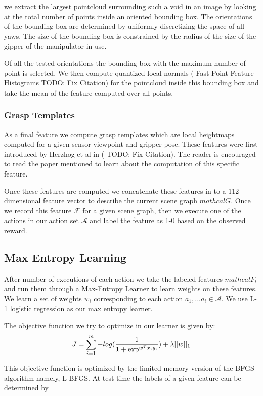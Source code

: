 we extract the largest pointcloud surrounding such a void in an image by looking at the total number of points inside an oriented bounding box. The orientations of the bounding box are determined by uniformly discretizing the space of all yaws. The size of the bounding box is constrained by the radius of the size of the gipper of the manipulator in use.

Of all the tested orientations the bounding box with the maximum number of point is selected. We then compute quantized local normals ( Fast Point Feature Histograms \cite{Javidi12_Journal} TODO: Fix Citation) for the pointcloud inside this bounding box and take the mean of the feature computed over all points.

\subsubsection{Grasp Templates}
As a final feature we compute grasp templates which are local heightmaps computed for a given sensor viewpoint and gripper pose. These features were first introduced by Herzhog et al in (\cite{Javidi12_Journal} TODO: Fix Citation). The reader is encouraged to read the paper mentioned to learn about the computation of this specific feature.

Once these features are computed we concatenate these features in to a 112 dimensional feature vector to describe the current scene graph $mathcal{G}$. Once we record this feature $\mathcal{F}$ for a given scene graph, then we execute one of the actions in our action set $\mathcal{A}$ and label the feature as 1-0 based on the observed reward.

\subsection{Max Entropy Learning}
After number of executions of each action we take the labeled features $mathcal{F}_l$ and run them through a Max-Entropy Learner to learn weights on these features. We learn a set of weights $w_i$ corresponding to each action ${a_1,...a_i}\in \mathcal{A}$. We use L-1 logistic regression as our max entropy learner.

The objective function we try to optimize in our learner is given by:
\[
J = \sum_{i=1}^m-log(\frac{1}{1+\exp^{w^Tx_iy_i}}) + \lambda||w||_1\\
\]

This objective function is optimized by the limited memory version of the BFGS algorithm namely, L-BFGS. At test time the labels of a given feature can be determined by 

